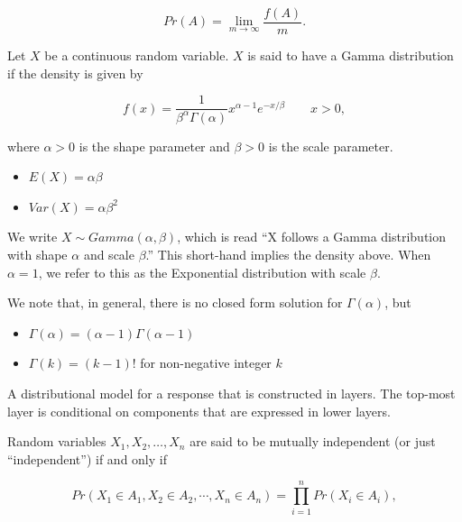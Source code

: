 \documentclass[
  letterpaper,
  DIV=11,
  numbers=noendperiod]{scrreprt}
\providecommand{\tightlist}{%
  \setlength{\itemsep}{0pt}\setlength{\parskip}{0pt}}\usepackage{longtable,booktabs,array}
\theoremstyle{definition}
\theoremstyle{plain}
\theoremstyle{definition}
\theoremstyle{remark}
\begin{document}
\[Pr(A) = \lim_{m \rightarrow \infty} \frac{f(A)}{m}.\]

\begin{description}
\tightlist
\item[Gamma Distribution (Definition~\ref{def-gamma-distribution})]
Let \(X\) be a continuous random variable. \(X\) is said to have a Gamma
distribution if the density is given by
\end{description}

\[f(x) = \frac{1}{\beta^{\alpha} \Gamma(\alpha)} x^{\alpha - 1} e^{-x/\beta} \qquad x > 0,\]

where \(\alpha > 0\) is the shape parameter and \(\beta > 0\) is the
scale parameter.

\begin{itemize}
\tightlist
\item
  \(E(X) = \alpha\beta\)
\item
  \(Var(X) = \alpha\beta^2\)
\end{itemize}

We write \(X \sim Gamma\left(\alpha, \beta\right)\), which is read ``X
follows a Gamma distribution with shape \(\alpha\) and scale
\(\beta\).'' This short-hand implies the density above. When
\(\alpha = 1\), we refer to this as the Exponential distribution with
scale \(\beta\).

We note that, in general, there is no closed form solution for
\(\Gamma(\alpha)\), but

\begin{itemize}
\tightlist
\item
  \(\Gamma(\alpha) = (\alpha - 1) \Gamma(\alpha - 1)\)
\item
  \(\Gamma(k) = (k - 1)!\) for non-negative integer \(k\)
\end{itemize}

\begin{description}
\tightlist
\item[Hierarchical Model (Definition~\ref{def-hierarchical-model})]
A distributional model for a response that is constructed in layers. The
top-most layer is conditional on components that are expressed in lower
layers.
\item[Independence (Definition~\ref{def-independence})]
Random variables \(X_1, X_2, \dotsc, X_n\) are said to be mutually
independent (or just ``independent'') if and only if
\end{description}

\[Pr\left(X_1 \in A_1, X_2 \in A_2, \dotsb, X_n \in A_n\right) = \prod_{i=1}^{n} Pr\left(X_i \in A_i\right),\]
\end{document}
